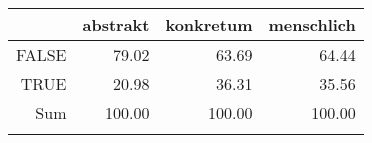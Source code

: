 \begin{tabular}{rrrr}
  \lsptoprule
 & abstrakt & konkretum & menschlich \\ 
  \midrule
FALSE & 79.02 & 63.69 & 64.44 \\ 
  TRUE & 20.98 & 36.31 & 35.56 \\ 
  Sum & 100.00 & 100.00 & 100.00 \\ 
   \lspbottomrule
\end{tabular}

